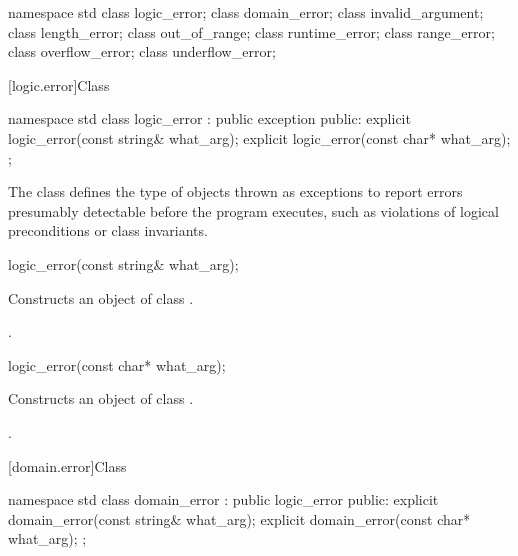 \begin{codeblock}
namespace std {
  class logic_error;
    class domain_error;
    class invalid_argument;
    class length_error;
    class out_of_range;
  class runtime_error;
    class range_error;
    class overflow_error;
    class underflow_error;
}
\end{codeblock}

[logic.error]{Class }

%
\begin{codeblock}
namespace std {
  class logic_error : public exception {
  public:
    explicit logic_error(const string& what_arg);
    explicit logic_error(const char* what_arg);
  };
}
\end{codeblock}

\pnum
The class
defines the type of objects thrown as
exceptions to report errors presumably detectable before
the program executes, such as violations of logical preconditions or class
invariants.

%
\begin{itemdecl}
logic_error(const string& what_arg);
\end{itemdecl}

\begin{itemdescr}
\pnum
\effects
Constructs an object of class
.

\pnum
\postconditions
{}.
\end{itemdescr}

%
\begin{itemdecl}
logic_error(const char* what_arg);
\end{itemdecl}

\begin{itemdescr}
\pnum
\effects
Constructs an object of class
.

\pnum
\postconditions
{}.
\end{itemdescr}

[domain.error]{Class }

%
\begin{codeblock}
namespace std {
  class domain_error : public logic_error {
  public:
    explicit domain_error(const string& what_arg);
    explicit domain_error(const char* what_arg);
  };
}
\end{codeblock}

